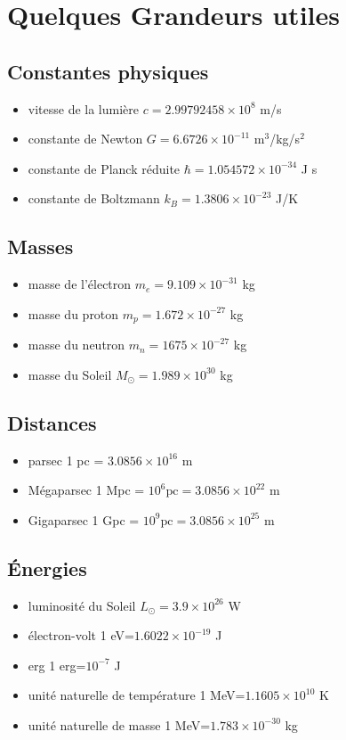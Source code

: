 \chapter*{Quelques Grandeurs utiles}

\section{Constantes physiques}
\begin{itemize}
\item vitesse de la lumière $c=2.99792458 \times 10^8$ m/s
\item constante de Newton $G=6.6726 \times 10^{-11}$ m$^3$/kg/s$^2$
\item constante de Planck réduite $\hbar = 1.054572\times 10^{-34}$ J s
\item constante de Boltzmann $k_B=1.3806 \times 10^{-23}$ J/K
\end{itemize}

\section{Masses}
\begin{itemize}
\item masse de l'électron $m_e=9.109\times10^{-31}$ kg
\item masse du proton $m_p=1.672\times10^{-27}$ kg
\item masse du neutron $m_n=1675\times10^{-27}$ kg
\item masse du Soleil $M_\odot=1.989\times 10^{30}$ kg
\end{itemize}

\section{Distances}
\begin{itemize}
\item parsec 1 pc = $3.0856\times 10^{16}$ m
\item Mégaparsec 1 Mpc = $10^6\mathrm{pc}=3.0856\times 10^{22}$ m
\item Gigaparsec 1 Gpc = $10^9\mathrm{pc}=3.0856\times 10^{25}$ m
\end{itemize}

\section{Énergies}
\begin{itemize}
\item luminosité du Soleil $L_\odot=3.9\times 10^{26}$ W
\item électron-volt 1 eV=$1.6022\times 10^{-19}$ J 
\item erg 1 erg=$10^{-7}$ J
\item unité naturelle de température 1 MeV=$1.1605\times 10^{10}$ K
\item unité naturelle de masse 1 MeV=$1.783\times10^{-30}$ kg
\end{itemize}

